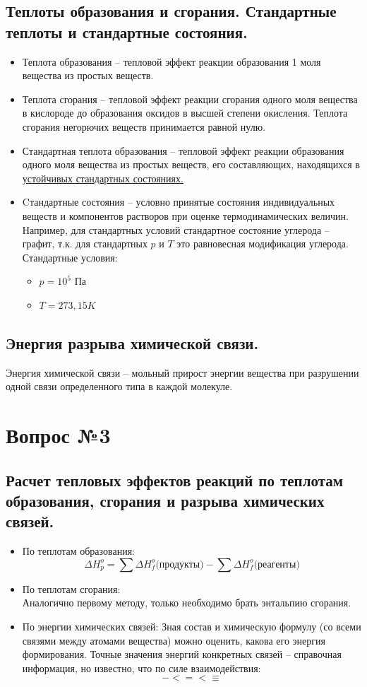 \documentclass[14pt,a4paper]{scrartcl}
\begin{document}
		\subsection*{Теплоты образования и сгорания. Стандартные теплоты и стандартные состояния.}
		\begin{itemize}
			\item Теплота образования -- тепловой эффект реакции образования 1 моля вещества из простых веществ.
			\item Теплота сгорания -- тепловой эффект реакции сгорания одного моля вещества в кислороде до образования оксидов в высшей степени окисления. Теплота сгорания негорючих веществ принимается равной нулю.
			\item Стандартная теплота образования -- тепловой эффект реакции образования одного моля вещества из простых веществ, его составляющих, находящихся в \underline{устойчивых стандартных состояниях.}
			\item Cтандартные состояния -- условно принятые состояния индивидуальных веществ и компонентов растворов при оценке термодинамических величин.  
			Например, для стандартных условий стандартное состояние углерода -- графит, т.к. для стандартных $p$ и $T$ это равновесная модификация углерода.
			Стандартные условия:
			\begin{itemize}
				\item $p = 10^5$ Па
				\item $T = 273,15 K$
			\end{itemize}
		\end{itemize}
		\subsection*{Энергия разрыва химической связи.}
		Энергия химической связи -- мольный прирост энергии вещества при разрушении одной связи определенного типа в каждой молекуле.			


\section*{Вопрос №3}	

		\subsection*{Расчет тепловых эффектов реакций по теплотам образования, сгорания и разрыва химических связей.}
		\begin{itemize}
			\item По теплотам образования: 
			$$\Delta{H_{p}^{o}} = \sum \Delta{H_{f}^o} \text{(продукты)} - \sum \Delta{H_{f}^o} \text{(реагенты)}  $$
			\item По теплотам сгорания: \\
			Аналогично первому методу, только необходимо брать энтальпию сгорания.
			\item По энергии химических связей:
			Зная состав и химическую формулу (со всеми связями между атомами вещества) можно оценить, какова его энергия формирования. Точные значения энергий конкретных связей -- справочная информация, но известно, что по силе взаимодействия:
			$$ -  <  =  <  \equiv $$
		\end{itemize}
\end{document}
